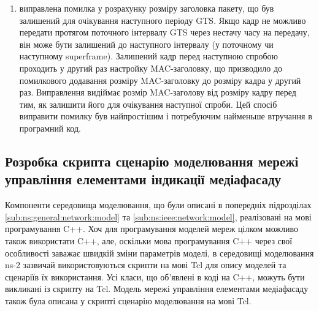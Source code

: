 \documentclass[a4paper,ukrainian,utf8,nocolumnsxix,floatsection,equationsection]{eskdtext}
\begin{document}
\begin{enumerate}
\begin{enumerate}
		\item виправлена помилка у розрахунку розміру заголовка пакету, що був залишений для очікування наступного періоду GTS. Якщо кадр не можливо передати протягом поточного інтервалу GTS через нестачу часу на передачу, він може бути залишений до наступного інтервалу (у поточному чи наступному superframe). Залишений кадр перед наступною спробою проходить у другий раз настройку MAC-заголовку, що призводило до помилкового додавання розміру MAC-заголовку до розміру кадра у другий раз. Виправлення видіймає розмір MAC-заголову від розміру кадру перед тим, як залишити його для очікування наступної спроби. Цей спосіб виправити помилку був найпростішим і потребуючим найменьше втручання в програмний код.
	\end{enumerate}

\end{enumerate}

\subsection{Розробка скрипта сценарію моделювання мережі управління елементами індикації медіафасаду}

Компоненти середовища моделювання, що були описані в попередніх підрозділах \ref{sub:ns:general:network:model} та \ref{sub:ns:ieee:network:model}, реалізовані на мові програмування C++. Хоч для програмування моделей мереж цілком можливо також використати C++, але, оскільки мова програмування C++ через свої особливості заважає швидкій зміни параметрів моделі, в середовищі моделювання ns-2 зазвичай використовуються скрипти на мові Tcl для опису моделей та сценаріїв їх використання. Усі класи, що об’явлені в коді на C++, можуть бути викликані із скрипту на Tcl. Модель мережі управління елементами медіафасаду також була описана у скрипті сценарію моделювання на мові Tcl.
\end{document}
